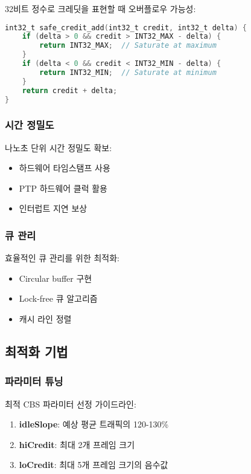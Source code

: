 \documentclass[twocolumn,10pt]{article}
\begin{document}
32비트 정수로 크레딧을 표현할 때 오버플로우 가능성:

\begin{lstlisting}[language=C, caption=오버플로우 방지 구현]
int32_t safe_credit_add(int32_t credit, int32_t delta) {
    if (delta > 0 && credit > INT32_MAX - delta) {
        return INT32_MAX;  // Saturate at maximum
    }
    if (delta < 0 && credit < INT32_MIN - delta) {
        return INT32_MIN;  // Saturate at minimum
    }
    return credit + delta;
}
\end{lstlisting}

\subsubsection{시간 정밀도}

나노초 단위 시간 정밀도 확보:

\begin{itemize}
    \item 하드웨어 타임스탬프 사용
    \item PTP 하드웨어 클럭 활용
    \item 인터럽트 지연 보상
\end{itemize}

\subsubsection{큐 관리}

효율적인 큐 관리를 위한 최적화:

\begin{itemize}
    \item Circular buffer 구현
    \item Lock-free 큐 알고리즘
    \item 캐시 라인 정렬
\end{itemize}

\subsection{최적화 기법}

\subsubsection{파라미터 튜닝}

최적 CBS 파라미터 선정 가이드라인:

\begin{enumerate}
    \item \textbf{idleSlope}: 예상 평균 트래픽의 120-130\%
    \item \textbf{hiCredit}: 최대 2개 프레임 크기
    \item \textbf{loCredit}: 최대 5개 프레임 크기의 음수값
\end{enumerate}
\end{document}
